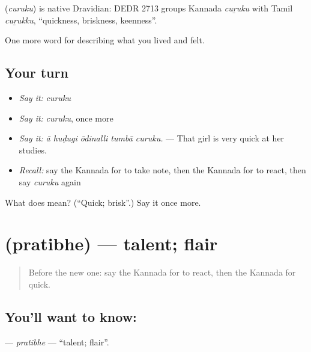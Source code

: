 \begin{cousinweb}
\textbf{} (\emph{curuku}) is native Dravidian: DEDR 2713 groups Kannada \emph{cuṟuku} with Tamil \emph{cuṟukku}, \textquotedblleft{}quickness, briskness, keenness\textquotedblright{}.
\end{cousinweb}

\begin{grammarlens}[title={What you've built}]
One more word for describing what you lived and felt.
\end{grammarlens}

\subsection*{Your turn}
\begin{itemize}
\raggedright
  \item \emph{Say it:} \emph{curuku}
  \item \emph{Say it:} \emph{curuku}, once more
  \item \emph{Say it:} \emph{ā huḍugi ōdinalli tumbā curuku.} — That girl is very quick at her studies.
  \item \emph{Recall:} say the Kannada for to take note, then the Kannada for to react, then say \emph{curuku} again
\end{itemize}

\begin{tcolorbox}[breakable,colback=teal!4,colframe=teal!35!black,title={Before you move on}]
What does  mean? (\textquotedblleft{}Quick; brisk\textquotedblright{}.) Say it once more.
\end{tcolorbox}
\section[\texorpdfstring{\kn{ಪ್ರತಿಭೆ} (pratibhe)}{ಪ್ರತಿಭೆ (pratibhe)}]{ (pratibhe) — talent; flair}

\label{lesson:KA-C503-pratibhe}



\begin{quote}
Before the new one: say the Kannada for to react, then the Kannada for quick.
\end{quote}

\subsection*{You'll want to know: }
\textbf{} — \emph{pratibhe} — \textquotedblleft{}talent; flair\textquotedblright{}.

